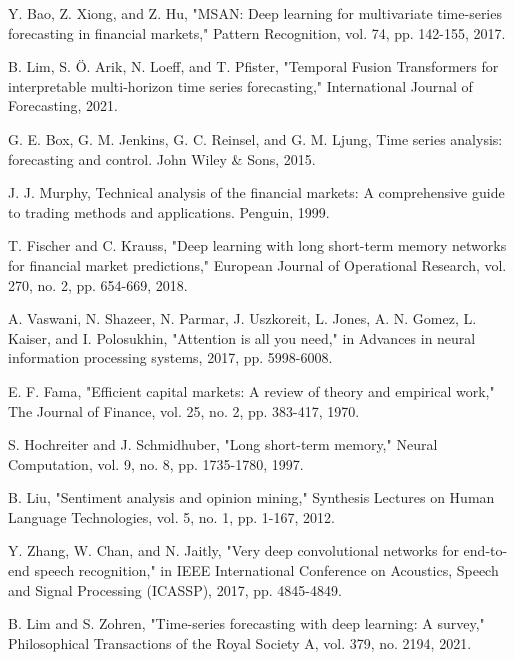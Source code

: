 \documentclass[conference]{IEEEtran}
\begin{document}
\begin{thebibliography}{00}
 Y. Bao, Z. Xiong, and Z. Hu, "MSAN: Deep learning for multivariate time-series forecasting in financial markets," Pattern Recognition, vol. 74, pp. 142-155, 2017.

 B. Lim, S. Ö. Arik, N. Loeff, and T. Pfister, "Temporal Fusion Transformers for interpretable multi-horizon time series forecasting," International Journal of Forecasting, 2021.

 G. E. Box, G. M. Jenkins, G. C. Reinsel, and G. M. Ljung, Time series analysis: forecasting and control. John Wiley \& Sons, 2015.

 J. J. Murphy, Technical analysis of the financial markets: A comprehensive guide to trading methods and applications. Penguin, 1999.

 T. Fischer and C. Krauss, "Deep learning with long short-term memory networks for financial market predictions," European Journal of Operational Research, vol. 270, no. 2, pp. 654-669, 2018.

 A. Vaswani, N. Shazeer, N. Parmar, J. Uszkoreit, L. Jones, A. N. Gomez, L. Kaiser, and I. Polosukhin, "Attention is all you need," in Advances in neural information processing systems, 2017, pp. 5998-6008.

 E. F. Fama, "Efficient capital markets: A review of theory and empirical work," The Journal of Finance, vol. 25, no. 2, pp. 383-417, 1970.

 S. Hochreiter and J. Schmidhuber, "Long short-term memory," Neural Computation, vol. 9, no. 8, pp. 1735-1780, 1997.

 B. Liu, "Sentiment analysis and opinion mining," Synthesis Lectures on Human Language Technologies, vol. 5, no. 1, pp. 1-167, 2012.

 Y. Zhang, W. Chan, and N. Jaitly, "Very deep convolutional networks for end-to-end speech recognition," in IEEE International Conference on Acoustics, Speech and Signal Processing (ICASSP), 2017, pp. 4845-4849.

 B. Lim and S. Zohren, "Time-series forecasting with deep learning: A survey," Philosophical Transactions of the Royal Society A, vol. 379, no. 2194, 2021.
\end{thebibliography}
\end{document}
